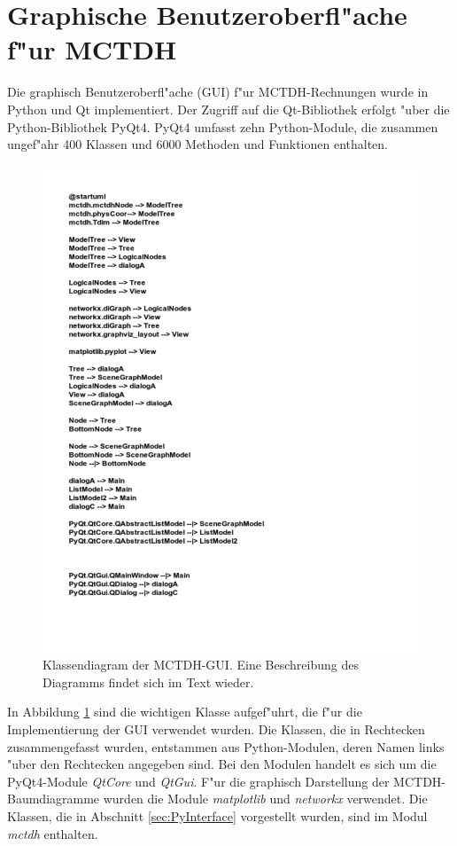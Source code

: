 \section{Graphische Benutzeroberfl"ache f"ur MCTDH}

 Die graphisch Benutzeroberfl"ache (GUI) f"ur MCTDH-Rechnungen wurde in Python und Qt implementiert.
 Der Zugriff auf die Qt-Bibliothek erfolgt "uber die Python-Bibliothek PyQt4. 
 PyQt4 umfasst zehn Python-Module, die zusammen ungef"ahr 400 Klassen und 6000 Methoden und Funktionen enthalten. \cite{PyQt}

 \begin{figure}
    \centering
    \vspace*{-0.5cm}\includegraphics[width=\textwidth, angle=90, scale=1.4]{figures/umlPyQt}
    \caption{Klassendiagram der MCTDH-GUI. Eine Beschreibung des Diagramms
     findet sich im Text wieder.}\label{fig:uml_PyQt}
\end{figure}

In Abbildung \ref{fig:uml_PyQt} sind die wichtigen Klasse aufgef"uhrt, die f"ur die Implementierung der GUI verwendet wurden. 
Die Klassen, die in Rechtecken zusammengefasst wurden, entstammen aus Python-Modulen, deren Namen links "uber den Rechtecken angegeben sind.
Bei den Modulen handelt es sich um die PyQt4-Module \textit{QtCore} und \textit{QtGui}. F"ur die graphisch Darstellung der MCTDH-Baumdiagramme
wurden die Module \textit{matplotlib} und \textit{networkx} verwendet. Die Klassen, die in Abschnitt \ref{sec:PyInterface} vorgestellt wurden,
sind im Modul \textit{mctdh} enthalten. 


